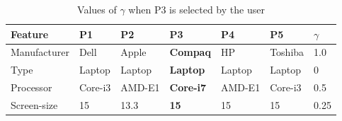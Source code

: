 \begin{table}
\renewcommand{\arraystretch}{1.5}
 \centering
 \begin{tabular}{|l| l l l l l |l|}
  \hline \hline
   Feature & P1 & P2 & \textbf{P3} & P4 & P5 & $\gamma$ \\
  \hline
  Manufacturer & Dell & Apple & \textbf{Compaq} & HP & Toshiba & 1.0 \\
  Type & Laptop & Laptop & \textbf{Laptop} & Laptop & Laptop & 0 \\
  Processor & Core-i3 & AMD-E1 & \textbf{Core-i7} & AMD-E1 & Core-i3 & 0.5\\
  Screen-size & 15 & 13.3 & \textbf{15} & 15 & 15 & 0.25\\
  \hline \hline
 \end{tabular}
 \caption{Values of $\gamma$ when P3 is selected by the user}
 \label{tab:wMLT}
\end{table}

